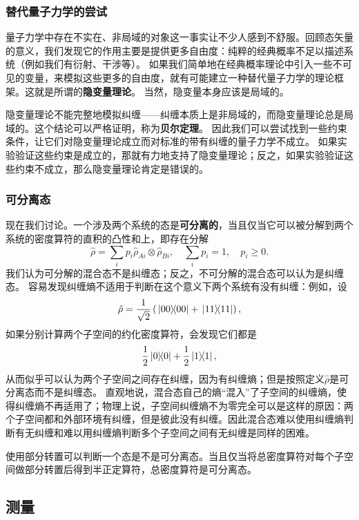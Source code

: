 \documentclass[UTF8, a4paper]{ctexart}
\begin{document}
\subsubsection{替代量子力学的尝试}

量子力学中存在不实在、非局域的对象这一事实让不少人感到不舒服。回顾态矢量的意义，我们发现它的作用主要是提供更多自由度：纯粹的经典概率不足以描述系统（例如我们有衍射、干涉等）。
如果我们简单地在经典概率理论中引入一些不可见的变量，来模拟这些更多的自由度，就有可能建立一种替代量子力学的理论框架。这就是所谓的\textbf{隐变量理论}。
当然，隐变量本身应该是局域的。

隐变量理论不能完整地模拟纠缠——纠缠本质上是非局域的，而隐变量理论总是局域的。这个结论可以严格证明，称为\textbf{贝尔定理}。
因此我们可以尝试找到一些约束条件，让它们对隐变量理论成立而对标准的带有纠缠的量子力学不成立。
如果实验验证这些约束是成立的，那就有力地支持了隐变量理论；反之，如果实验验证这些约束不成立，那么隐变量理论肯定是错误的。

\subsubsection{可分离态}\label{sec:separatable}

现在我们讨论。一个涉及两个系统的态是\textbf{可分离的}，当且仅当它可以被分解到两个系统的密度算符的直积的凸性和上，即存在分解
\begin{equation}
    \hat{\rho} = \sum_i p_i \hat{\rho}_{A i} \otimes \hat{\rho}_{B i}, \quad \sum_i p_i = 1, \quad p_i \geq 0.
\end{equation}
我们认为可分解的混合态不是纠缠态；反之，不可分解的混合态可以认为是纠缠态。
容易发现纠缠熵不适用于判断在这个意义下两个系统有没有纠缠：例如，设
\[
    \hat{\rho} = \frac{1}{\sqrt{2}} \left( \dyad*{00} + \dyad*{11} \right),
\]
如果分别计算两个子空间的约化密度算符，会发现它们都是
\[
    \frac{1}{2} \dyad*{0} + \frac{1}{2} \dyad*{1},
\]
从而似乎可以认为两个子空间之间存在纠缠，因为有纠缠熵；但是按照定义$\hat{\rho}$是可分离态而不是纠缠态。
直观地说，混合态自己的熵“混入”了子空间的纠缠熵，使得纠缠熵不再适用了；物理上说，子空间纠缠熵不为零完全可以是这样的原因：两个子空间都和外部环境有纠缠，但是彼此没有纠缠。因此混合态难以使用纠缠熵判断有无纠缠和难以用纠缠熵判断多个子空间之间有无纠缠是同样的困难。

使用部分转置可以判断一个态是不是可分离态。当且仅当将总密度算符对每个子空间做部分转置后得到半正定算符，总密度算符是可分离态。

\subsection{测量}
\end{document}
